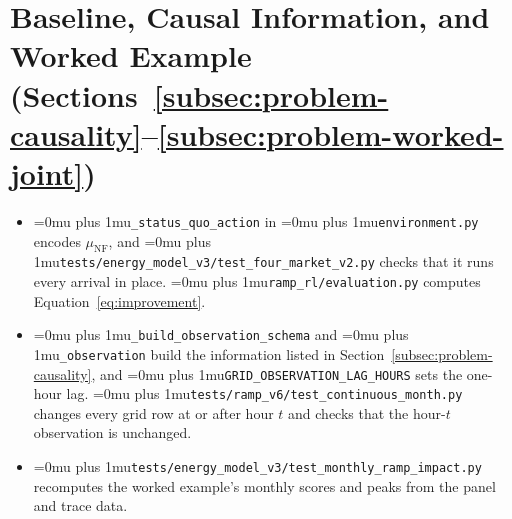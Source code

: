 \documentclass{UNCC-thesis}
\newcommand{\codepath}[1]{{\Urlmuskip=0mu plus 1mu\relax\nolinkurl{#1}}}
\begin{document}
\section{Baseline, Causal Information, and Worked Example
  (Sections~\ref{subsec:problem-causality}--\ref{subsec:problem-worked-joint})}
\begin{itemize}
  \item \codepath{_status_quo_action} in \codepath{environment.py} encodes
        \(\mu_{\mathrm{NF}}\), and
        \codepath{tests/energy_model_v3/test_four_market_v2.py} checks that it
        runs every arrival in place. \codepath{ramp_rl/evaluation.py} computes
        Equation~\eqref{eq:improvement}.
  \item \codepath{_build_observation_schema} and \codepath{_observation} build
        the information listed in Section~\ref{subsec:problem-causality}, and
        \codepath{GRID_OBSERVATION_LAG_HOURS} sets the
        one-hour lag. \codepath{tests/ramp_v6/test_continuous_month.py} changes
        every grid row at or after hour \(t\) and checks that the hour-\(t\)
        observation is unchanged.
  \item \codepath{tests/energy_model_v3/test_monthly_ramp_impact.py}
        recomputes the worked example's monthly scores and peaks from the
        panel and trace data.
\end{itemize}

\end{document}
